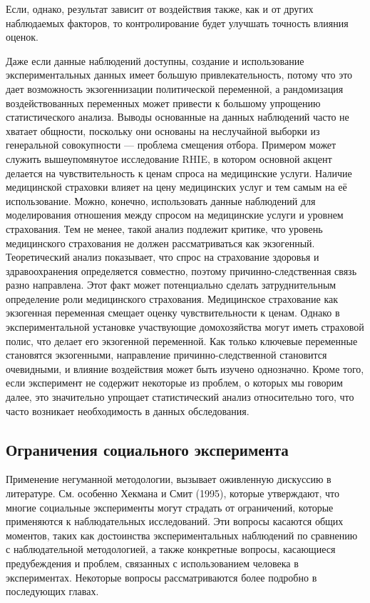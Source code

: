 Если, однако, результат зависит от воздействия также, как и от других наблюдаемых факторов, то контролирование будет улучшать точность влияния оценок.


Даже если данные наблюдений доступны, создание и использование экспериментальных данных имеет большую привлекательность, потому что это дает возможность экзогеннизации политической переменной, а рандомизация воздействованных переменных может привести к большому упрощению статистического анализа. Выводы основанные на данных наблюдений часто не хватает общности, поскольку они основаны на неслучайной выборки из генеральной совокупности --- проблема смещения отбора. Примером может служить вышеупомянутое исследование RHIE, в котором основной акцент делается на чувствительность к ценам спроса на медицинские услуги. Наличие медицинской страховки влияет на цену медицинских услуг и тем самым на её использование. Можно, конечно, использовать данные наблюдений для моделирования отношения между спросом на медицинские услуги и уровнем страхования. Тем не менее, такой анализ подлежит критике, что уровень медицинского страхования не должен рассматриваться как экзогенный. Теоретический анализ показывает, что спрос на страхование здоровья и здравоохранения определяется совместно, поэтому причинно-следственная связь разно направлена. Этот факт может потенциально сделать затруднительным определение роли медицинского страхования. Медицинское страхование как экзогенная переменная смещает оценку чувствительности к ценам. Однако в экспериментальной установке участвующие домохозяйства могут иметь страховой полис, что делает его экзогенной переменной. Как только ключевые переменные становятся экзогенными, направление причинно-следственной становится очевидными, и влияние воздействия может быть изучено однозначно. Кроме того, если эксперимент не содержит некоторые из проблем, о которых мы говорим далее, это значительно упрощает статистический анализ относительно того, что часто возникает необходимость в данных обследования.




\subsection{Ограничения социального эксперимента}

Применение негуманной методологии, вызывает оживленную дискуссию в литературе. См. особенно Хекмана и Смит (1995), которые утверждают, что многие социальные эксперименты могут страдать от ограничений, которые применяются к наблюдательных исследований. Эти вопросы касаются общих моментов, таких как достоинства экспериментальных наблюдений по сравнению с наблюдательной методологией, а также конкретные вопросы, касающиеся предубеждения и проблем, связанных с использованием человека в экспериментах. Некоторые вопросы рассматриваются более подробно в последующих главах.


